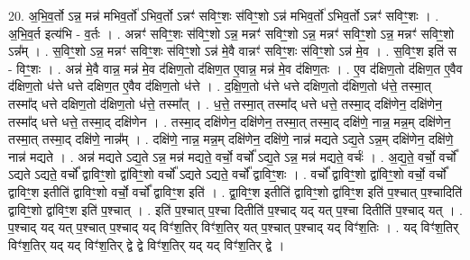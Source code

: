 \documentclass[17pt]{extarticle}
\begin{document}
20. अ॒भि॒व॒र्तो ऽन्न॒ मन्न॑ मभिव॒र्तो॑ ऽभिव॒र्तो ऽन्नꣳ॑ सविꣳ॒॒शः स॑विꣳ॒॒शो ऽन्न॑ मभिव॒र्तो॑ ऽभिव॒र्तो ऽन्नꣳ॑ सविꣳ॒॒शः । . अ॒भि॒व॒र्त इत्य॑भि - व॒र्तः । . अन्नꣳ॑ सविꣳ॒॒शः स॑विꣳ॒॒शो ऽन्न॒ मन्नꣳ॑ सविꣳ॒॒शो ऽन्न॒ मन्नꣳ॑ सविꣳ॒॒शो ऽन्न॒ मन्नꣳ॑ सविꣳ॒॒शो ऽन्न᳚म् । . स॒विꣳ॒॒शो ऽन्न॒ मन्नꣳ॑ सविꣳ॒॒शः स॑विꣳ॒॒शो ऽन्न॑ मे॒वै वान्नꣳ॑ सविꣳ॒॒शः स॑विꣳ॒॒शो ऽन्न॑ मे॒व । . स॒विꣳ॒॒श इति॑ स - विꣳ॒॒शः । . अन्न॑ मे॒वै वान्न॒ मन्न॑ मे॒व द॑क्षिण॒तो द॑क्षिण॒त ए॒वान्न॒ मन्न॑ मे॒व द॑क्षिण॒तः । . ए॒व द॑क्षिण॒तो द॑क्षिण॒त ए॒वैव द॑क्षिण॒तो ध॑त्ते धत्ते दक्षिण॒त ए॒वैव द॑क्षिण॒तो ध॑त्ते । . द॒क्षि॒ण॒तो ध॑त्ते धत्ते दक्षिण॒तो द॑क्षिण॒तो ध॑त्ते॒ तस्मा॒त् तस्मा᳚द् धत्ते दक्षिण॒तो द॑क्षिण॒तो ध॑त्ते॒ तस्मा᳚त् । . ध॒त्ते॒ तस्मा॒त् तस्मा᳚द् धत्ते धत्ते॒ तस्मा॒द् दक्षि॑णेन॒ दक्षि॑णेन॒ तस्मा᳚द् धत्ते धत्ते॒ तस्मा॒द् दक्षि॑णेन । . तस्मा॒द् दक्षि॑णेन॒ दक्षि॑णेन॒ तस्मा॒त् तस्मा॒द् दक्षि॑णे॒ नान्न॒ मन्न॒म् दक्षि॑णेन॒ तस्मा॒त् तस्मा॒द् दक्षि॑णे॒ नान्न᳚म् । . दक्षि॑णे॒ नान्न॒ मन्न॒म् दक्षि॑णेन॒ दक्षि॑णे॒ नान्न॑ मद्यते ऽद्य॒ते ऽन्न॒म् दक्षि॑णेन॒ दक्षि॑णे॒ नान्न॑ मद्यते । . अन्न॑ मद्यते ऽद्य॒ते ऽन्न॒ मन्न॑ मद्यते॒ वर्चो॒ वर्चो᳚ ऽद्य॒ते ऽन्न॒ मन्न॑ मद्यते॒ वर्चः॑ । . अ॒द्य॒ते॒ वर्चो॒ वर्चो᳚ ऽद्यते ऽद्यते॒ वर्चो᳚ द्वाविꣳ॒॒शो द्वा॑विꣳ॒॒शो वर्चो᳚ ऽद्यते ऽद्यते॒ वर्चो᳚ द्वाविꣳ॒॒शः । . वर्चो᳚ द्वाविꣳ॒॒शो द्वा॑विꣳ॒॒शो वर्चो॒ वर्चो᳚ द्वाविꣳ॒॒श इतीति॑ द्वाविꣳ॒॒शो वर्चो॒ वर्चो᳚ द्वाविꣳ॒॒श इति॑ । . द्वा॒विꣳ॒॒श इतीति॑ द्वाविꣳ॒॒शो द्वा॑विꣳ॒॒श इति॑ प॒श्चात् प॒श्चादिति॑ द्वाविꣳ॒॒शो द्वा॑विꣳ॒॒श इति॑ प॒श्चात् । . इति॑ प॒श्चात् प॒श्चा दितीति॑ प॒श्चाद् यद् यत् प॒श्चा दितीति॑ प॒श्चाद् यत् । . प॒श्चाद् यद् यत् प॒श्चात् प॒श्चाद् यद् विꣳ॑श॒तिर् विꣳ॑श॒तिर् यत् प॒श्चात् प॒श्चाद् यद् विꣳ॑श॒तिः । . यद् विꣳ॑श॒तिर् विꣳ॑श॒तिर् यद् यद् विꣳ॑श॒तिर् द्वे द्वे विꣳ॑श॒तिर् यद् यद् विꣳ॑श॒तिर् द्वे । \newline
\end{document}
